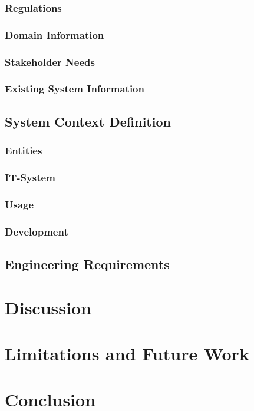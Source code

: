 \subsection{Regulations}

\subsection{Domain Information}

\subsection{Stakeholder Needs}

\subsection{Existing System Information}


\section{System Context Definition}
\subsection{Entities}

\subsection{IT-System}

\subsection{Usage}

\subsection{Development}


\section{Engineering Requirements}


\chapter{Discussion}


\chapter{Limitations and Future Work}


\chapter{Conclusion}